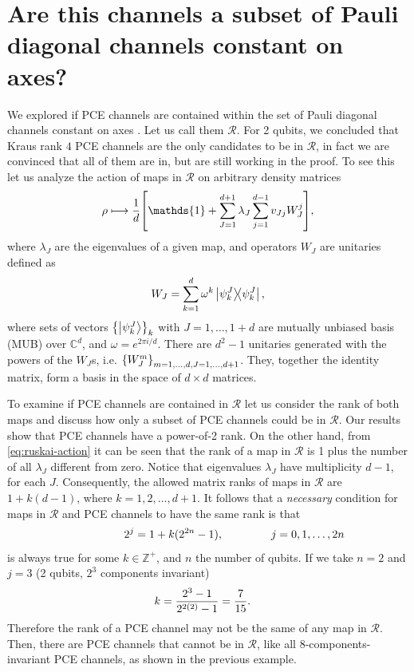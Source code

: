 \documentclass[11pt,dvipsnames]{article} %
\newcommand{\1}{\mathds{1}}
\newcommand{\R}{\mathcal{R}}
\begin{document}
\section*{Are this channels a subset of Pauli diagonal channels constant on axes?} %
We explored if PCE channels are contained within the set of Pauli diagonal
channels constant on axes \cite{nathanson2007pauli}. Let us call them
$\mathcal{R}$. For 2 qubits, we concluded that Kraus rank $4$ 
PCE channels are the only candidates to
be in $\mathcal{R}$, in fact we are convinced that all of them are in, but are
still working in the proof. 
To see this let us analyze the action of maps in $\R$ 
on arbitrary density matrices
\begin{align}
	\rho \longmapsto \frac{1}{d}\qty[\1 + \sum _{J=1}^{d+1} \lambda_J
	\sum _{j=1}^{d-1}	v_{Jj}W_J^j],
	\label{eq:ruskai-action}
\end{align}
where $\lambda_J$ are the eigenvalues of a given map, and operators $W_J$ are unitaries defined as
\begin{equation}
	W_J = \sum _{k=1}^{d}\omega^k \dyad{\psi_k^J}{\psi_k^J}, 
\end{equation}
where sets of vectors $\qty{\ket{\psi_k^J}}_k$ with $J=1,\dots, 1+d$ are mutually unbiased basis (MUB) over $\mathbb{C}^d$, and $\omega = e^{2\pi i/d}$. There are $d^2-1$ unitaries generated with the powers of the $W_J$s, i.e.
$\qty{W_J^m}_{m=1,\ldots,d,J=1,\ldots,d+1}$. They, together the identity matrix, form a basis in the space of $d\times d$ matrices.

 

To examine if PCE channels are contained in $\R$ let us consider
the rank of both maps and discuss how only a subset of PCE channels
could be in $\R$. Our results show that PCE channels have 
a power-of-2 rank. On the other hand, from \eqref{eq:ruskai-action} it
can be seen that the rank of a map in $\R$ is 1 plus 
the number of all $\lambda_J$ different from zero. Notice that eigenvalues $\lambda_J$ have multiplicity $d-1$, for each $J$. Consequently, the allowed matrix ranks 
of maps in $\R$ are $1 + k(d-1)$, where $k = 1,2,\ldots,d+1$. It follows
that a \textit{necessary} condition for maps in $\R$ and PCE channels to have the 
same rank is that
\begin{align}
	\hspace{2cm}2^j&=1 + k(2^{2n}-1),	\hspace{1.5cm} j=0,1,\ldots,2n
\end{align}
is always true for some $k\in \mathbb{Z^+}$, and $n$ the number 
of qubits. If we take $n=2$ and $j=3$ 
(2 qubits, $2^3$ components invariant)
\begin{align}
	k&= \frac{2^3-1}{2^{2\qty(2)}-1}=\frac{7}{15}.
\end{align}
Therefore the rank of a PCE channel may not be the same of any map in $\R$.
Then, there are PCE channels that cannot be in $\R$, like
all 8-components-invariant PCE channels, as shown in the previous example. 
\end{document}
